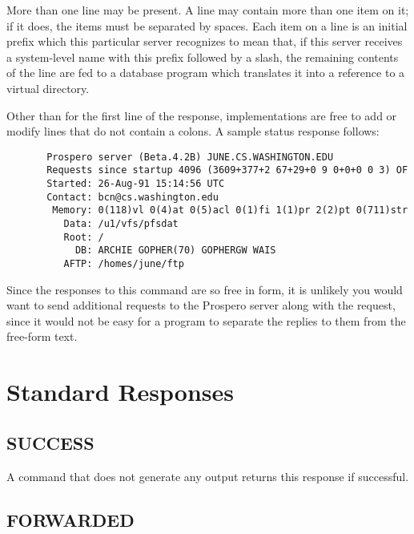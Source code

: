 More than one  line may be present.  A  line may
contain more than 
one item on it; if it does, the items must be separated by spaces.
Each item on a  line is an initial prefix which this particular
server recognizes to mean that, if this server receives a system-level
name with this prefix followed by a slash, the remaining contents of
the line are fed to a database program which translates it into a
reference to a virtual directory.  

Other than for the first line of the response, implementations are
free to add or modify lines that do not contain a colons.  A sample
status response follows:

\begin{verbatim}
       Prospero server (Beta.4.2B) JUNE.CS.WASHINGTON.EDU
       Requests since startup 4096 (3609+377+2 67+29+0 9 0+0+0 0 3) OF
       Started: 26-Aug-91 15:14:56 UTC
       Contact: bcn@cs.washington.edu
        Memory: 0(118)vl 0(4)at 0(5)acl 0(1)fi 1(1)pr 2(2)pt 0(711)str
          Data: /u1/vfs/pfsdat
          Root: /
            DB: ARCHIE GOPHER(70) GOPHERGW WAIS
          AFTP: /homes/june/ftp
\end{verbatim}

Since the responses to this command are so free in form, it is
unlikely you would want to send additional requests to the Prospero
server along with the  request, since it would not be easy for a
program to separate the replies to them from the free-form text.

\chapter{Standard Responses}

\section{SUCCESS}

\begin{command}
\commandsize
 \protect{} \zoos\protect{}\zooe
\end{command}

A command that does not generate any output returns this response if
successful.

\section{FORWARDED}

